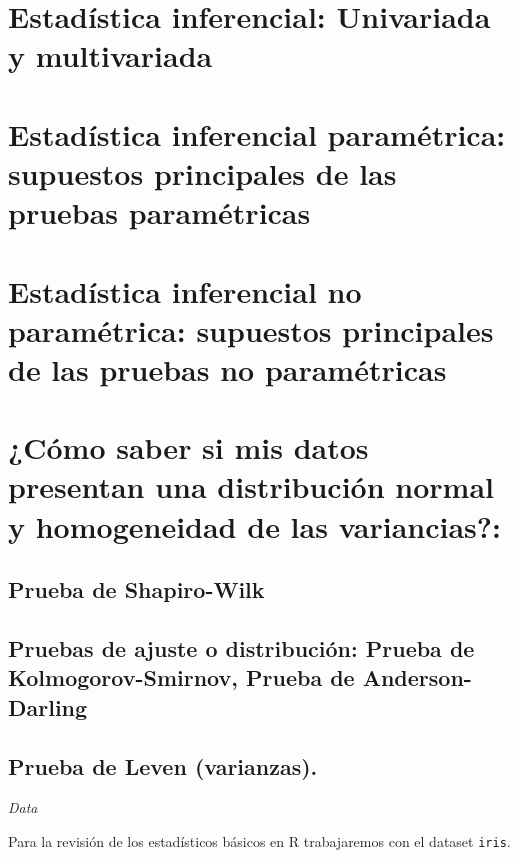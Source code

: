 \documentclass[
]{book}
\begin{document}
\section{Estadística inferencial: Univariada y multivariada}\label{estaduxedstica-inferencial-univariada-y-multivariada}

\section{Estadística inferencial paramétrica: supuestos principales de las pruebas paramétricas}\label{estaduxedstica-inferencial-paramuxe9trica-supuestos-principales-de-las-pruebas-paramuxe9tricas}

\section{Estadística inferencial no paramétrica: supuestos principales de las pruebas no paramétricas}\label{estaduxedstica-inferencial-no-paramuxe9trica-supuestos-principales-de-las-pruebas-no-paramuxe9tricas}

\section{¿Cómo saber si mis datos presentan una distribución normal y homogeneidad de las variancias?:}\label{cuxf3mo-saber-si-mis-datos-presentan-una-distribuciuxf3n-normal-y-homogeneidad-de-las-variancias}

\subsection{Prueba de Shapiro-Wilk}\label{prueba-de-shapiro-wilk}

\subsection{Pruebas de ajuste o distribución: Prueba de Kolmogorov-Smirnov, Prueba de Anderson-Darling}\label{pruebas-de-ajuste-o-distribuciuxf3n-prueba-de-kolmogorov-smirnov-prueba-de-anderson-darling}

\subsection{Prueba de Leven (varianzas).}\label{prueba-de-leven-varianzas.}

\emph{Data}

Para la revisión de los estadísticos básicos en R trabajaremos con el dataset \texttt{iris}.
\end{document}
